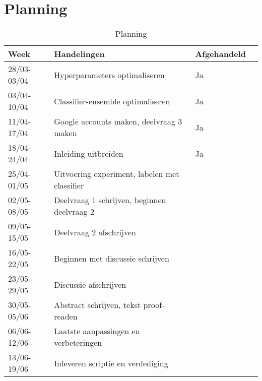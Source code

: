 \documentclass[../main.tex]{subfiles}
\begin{document}
\section{Planning}

\begin{table}[!b]
\centering
\caption{Planning}
\label{tab:planning}
\begin{tabular}{@{}ll@{}ll@{}}
\toprule
Week        & Handelingen                                                     & Afgehandeld \\ \midrule
28/03-03/04 & Hyperparameters optimaliseren                                   &     Ja      \\
03/04-10/04 & Classifier-ensemble optimaliseren                               &     Ja      \\
11/04-17/04 & Google accounts maken, deelvraag 3 maken                        &     Ja      \\
18/04-24/04 & Inleiding uitbreiden                                            &     Ja      \\
25/04-01/05 & Uitvoering experiment, labelen met classifier                   &             \\
02/05-08/05 & Deelvraag 1 schrijven, beginnen deelvraag 2                     &             \\
09/05-15/05 & Deelvraag 2 afschrijven                                         &             \\
16/05-22/05 & Beginnen met discussie schrijven                                &             \\
23/05-29/05 & Discussie afschrijven                                           &             \\
30/05-05/06 & Abstract schrijven, tekst proof-readen                          &             \\
06/06-12/06 & Laatste aanpassingen en verbeteringen                           &             \\
13/06-19/06 & Inleveren scriptie en verdediging                               &             \\ \bottomrule
\end{tabular}

\end{table}
\end{document}
